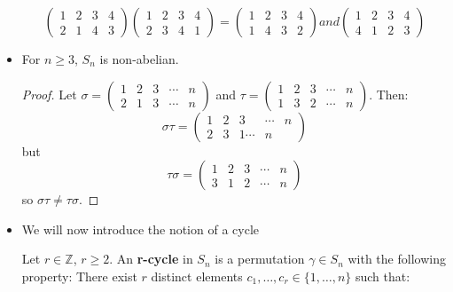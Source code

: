 \begin{itemize}
\begin{example}
\begin{equation}
\begin{pmatrix}
                1&2&3&4\\ 2&1&4&3
            \end{pmatrix}\begin{pmatrix}
                1&2&3&4\\ 2&3&4&1
            \end{pmatrix} = \begin{pmatrix}
                1&2&3&4 \\ 1&4&3&2
            \end{pmatrix}
            and
            \begin{pmatrix}
                1&2&3&4 \\ 
                4&1&2&3
            \end{pmatrix}
        \end{equation}
    \end{example}
    \item For $n\ge 3$, $S_n$ is non-abelian.
    \begin{proof}
        Let $\sigma = \begin{pmatrix}
            1&2&3&\cdots&n\\ 2&1&3&\cdots&n
        \end{pmatrix}$ and $\tau = \begin{pmatrix}
            1&2&3&\cdots & n \\ 
            1&3&2&\cdots & n
        \end{pmatrix}$. Then:
        \begin{equation}
            \sigma\tau = \begin{pmatrix}
                1&2&3&\cdots&n \\ 
                2&3&1 \cdots &n
            \end{pmatrix}
        \end{equation}
        but
        \begin{equation}
            \tau\sigma = \begin{pmatrix}
                1&2&3&\cdots & n \\ 
                3&1&2 & \cdots & n
            \end{pmatrix}
        \end{equation}
        so $\sigma\tau \neq \tau \sigma$.
    \end{proof}
    \item We will now introduce the notion of a cycle
    \begin{definition}
        Let $r\in \mathbb{Z}$, $r\ge 2$. An \textbf{r-cycle} in $S_n$ is a permutation $\gamma \in S_n$ with the following property: There exist $r$ distinct elements $c_1,\dots,c_r \in \{1,\dots,n\}$ such that:

\end{definition}
\end{itemize}
